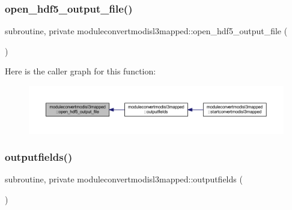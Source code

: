\subsubsection{\texorpdfstring{open\+\_\+hdf5\+\_\+output\+\_\+file()}{open\_hdf5\_output\_file()}}
{\footnotesize\ttfamily subroutine, private moduleconvertmodisl3mapped\+::open\+\_\+hdf5\+\_\+output\+\_\+file (\begin{DoxyParamCaption}{ }\end{DoxyParamCaption})\hspace{0.3cm}{\ttfamily [private]}}

Here is the caller graph for this function\+:\nopagebreak
\begin{figure}[H]
\begin{center}
\leavevmode
\includegraphics[width=350pt]{namespacemoduleconvertmodisl3mapped_ae7ff1f4d8258c08682ea6db04a074c74_icgraph}
\end{center}
\end{figure}
\mbox{\label{namespacemoduleconvertmodisl3mapped_ac1aafb9181d66e361d34ec58c03d59bb}} 
\subsubsection{\texorpdfstring{outputfields()}{outputfields()}}
{\footnotesize\ttfamily subroutine, private moduleconvertmodisl3mapped\+::outputfields (\begin{DoxyParamCaption}{ }\end{DoxyParamCaption})\hspace{0.3cm}{\ttfamily [private]}}

